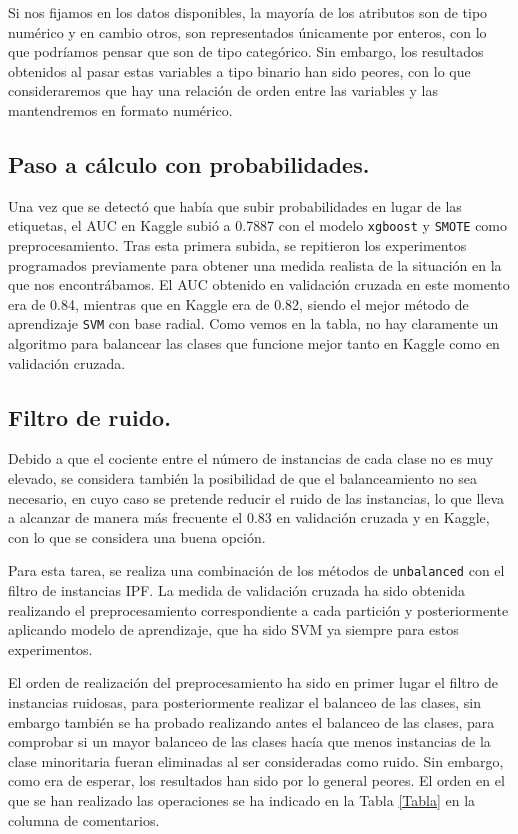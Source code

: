 \documentclass[11pt]{article}
\begin{document}
Si nos fijamos en los datos disponibles, la mayoría de los atributos
son de tipo numérico y en cambio otros, son representados únicamente
por enteros, con lo que podríamos pensar que son de tipo
categórico. Sin embargo, los resultados obtenidos al pasar estas
variables a tipo binario han sido peores, con lo que consideraremos
que hay una relación de orden entre las variables y las mantendremos
en formato numérico.

\subsection{Paso a cálculo con probabilidades.}
\label{sec:org0aabce5}

Una vez que se detectó que había que subir probabilidades en lugar de
las etiquetas, el AUC en Kaggle subió a 0.7887 con el modelo \texttt{xgboost}
y \texttt{SMOTE} como preprocesamiento. Tras esta primera subida, se
repitieron los experimentos programados previamente para obtener una
medida realista de la situación en la que nos encontrábamos. El AUC
obtenido en validación cruzada en este momento era de 0.84, mientras
que en Kaggle era de 0.82, siendo el mejor método de aprendizaje \texttt{SVM}
con base radial. Como vemos en la tabla, no hay claramente un
algoritmo para balancear las clases que funcione mejor tanto en Kaggle
como en validación cruzada.

\subsection{Filtro de ruido.}
\label{sec:org9f0e3ed}

Debido a que el cociente entre el número de instancias de cada clase
no es muy elevado, se considera también la posibilidad de que el
balanceamiento no sea necesario, en cuyo caso se pretende reducir el
ruido de las instancias, lo que lleva a alcanzar de manera más
frecuente el 0.83 en validación cruzada y en Kaggle, con lo que se
considera una buena opción. 

Para esta tarea, se realiza una combinación de los métodos de
\texttt{unbalanced} con el filtro de instancias IPF. La medida de validación
cruzada ha sido obtenida realizando el preprocesamiento
correspondiente a cada partición y posteriormente aplicando modelo de
aprendizaje, que ha sido SVM ya siempre para estos experimentos.

El orden de realización del preprocesamiento ha sido en primer lugar
el filtro de instancias ruidosas, para posteriormente realizar el
balanceo de las clases, sin embargo también se ha probado realizando
antes el balanceo de las clases, para comprobar si un mayor balanceo
de las clases hacía que menos instancias de la clase minoritaria
fueran eliminadas al ser consideradas como ruido. Sin embargo, como
era de esperar, los resultados han sido por lo general peores. El
orden en el que se han realizado las operaciones se ha indicado en la
Tabla \ref{Tabla} en la columna de comentarios.
\end{document}
